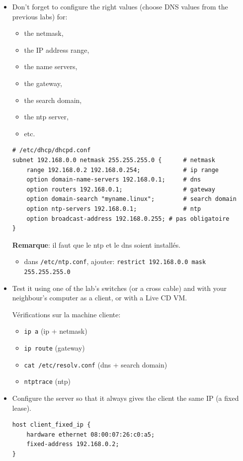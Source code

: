 \documentclass[a4paper]{article}
\begin{document}
\begin{itemize}
\item Don't forget to configure the right values (choose DNS values from the previous labs) for:
\begin{itemize}
    \item the netmask,
    \item the IP address range,
    \item the name servers,
    \item the gateway,
    \item the search domain,
    \item the ntp server,
    \item etc.
\end{itemize}
\begin{example}
\begin{verbatim}
# /etc/dhcp/dhcpd.conf
subnet 192.168.0.0 netmask 255.255.255.0 {      # netmask
    range 192.168.0.2 192.168.0.254;            # ip range
    option domain-name-servers 192.168.0.1;     # dns
    option routers 192.168.0.1;                 # gateway
    option domain-search "myname.linux";        # search domain
    option ntp-servers 192.168.0.1;             # ntp
    option broadcast-address 192.168.0.255; # pas obligatoire
}
\end{verbatim}
\textbf{Remarque}: il faut que le ntp et le dns soient installés.
\begin{itemize}
    \item dans \texttt{/etc/ntp.conf}, ajouter: \texttt{restrict 192.168.0.0 mask 255.255.255.0}
\end{itemize}
\end{example}

\item Test it using one of the lab's switches (or a cross cable) and with your neighbour’s computer as a client, or with a Live CD VM.
\begin{example}
    Vérifications sur la machine cliente:
    \begin{itemize}
        \item \texttt{ip a} (ip + netmask)
        \item \texttt{ip route} (gateway)
        \item \texttt{cat /etc/resolv.conf} (dns + search domain)
        \item \texttt{ntptrace} (ntp)
    \end{itemize}
\end{example}

\item Configure the server so that it always gives the client the same IP (a fixed lease).
\begin{example}
\begin{verbatim}
host client_fixed_ip {
    hardware ethernet 08:00:07:26:c0:a5;
    fixed-address 192.168.0.2;
}
\end{verbatim}
\end{example}

\end{itemize}
\end{document}
